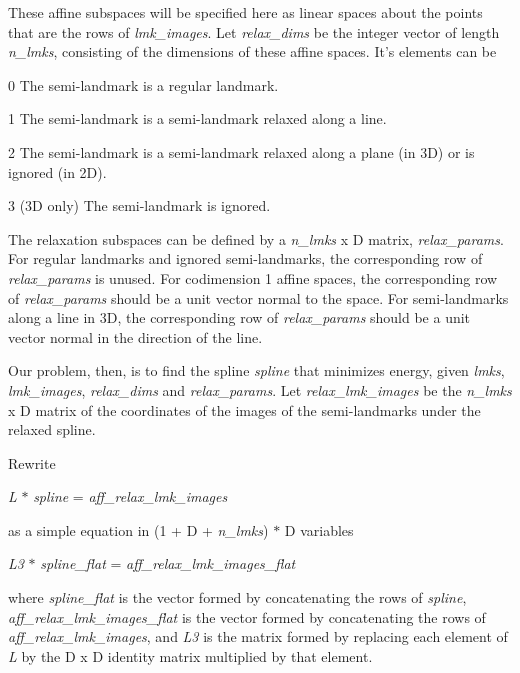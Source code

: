 These affine subspaces will be specified here as linear spaces about the points that are the rows of {\itshape lmk\_\-images\/}. Let {\itshape relax\_\-dims\/} be the integer vector of length {\itshape n\_\-lmks\/}, consisting of the dimensions of these affine spaces. It's elements can be
\begin{DoxyItemize}
\item 0 The semi-\/landmark is a regular landmark.
\item 1 The semi-\/landmark is a semi-\/landmark relaxed along a line.
\item 2 The semi-\/landmark is a semi-\/landmark relaxed along a plane (in 3D) or is ignored (in 2D).
\item 3 (3D only) The semi-\/landmark is ignored.
\end{DoxyItemize}

The relaxation subspaces can be defined by a {\itshape n\_\-lmks\/} x D matrix, {\itshape relax\_\-params\/}. For regular landmarks and ignored semi-\/landmarks, the corresponding row of {\itshape relax\_\-params\/} is unused. For codimension 1 affine spaces, the corresponding row of {\itshape relax\_\-params\/} should be a unit vector normal to the space. For semi-\/landmarks along a line in 3D, the corresponding row of {\itshape relax\_\-params\/} should be a unit vector normal in the direction of the line.

Our problem, then, is to find the spline {\itshape spline\/} that minimizes energy, given {\itshape lmks\/}, {\itshape lmk\_\-images\/}, {\itshape relax\_\-dims\/} and {\itshape relax\_\-params\/}. Let {\itshape relax\_\-lmk\_\-images\/} be the {\itshape n\_\-lmks\/} x D matrix of the coordinates of the images of the semi-\/landmarks under the relaxed spline.

Rewrite \begin{center} {\itshape L\/} $\ast$ {\itshape spline\/} = {\itshape aff\_\-relax\_\-lmk\_\-images\/} \end{center}  as a simple equation in (1 + D + {\itshape n\_\-lmks\/}) $\ast$ D variables \begin{center} {\itshape L3\/} $\ast$ {\itshape spline\_\-flat\/} = {\itshape aff\_\-relax\_\-lmk\_\-images\_\-flat\/} \end{center}  where {\itshape spline\_\-flat\/} is the vector formed by concatenating the rows of {\itshape spline\/}, {\itshape aff\_\-relax\_\-lmk\_\-images\_\-flat\/} is the vector formed by concatenating the rows of {\itshape aff\_\-relax\_\-lmk\_\-images\/}, and {\itshape L3\/} is the matrix formed by replacing each element of {\itshape L\/} by the D x D identity matrix multiplied by that element.

